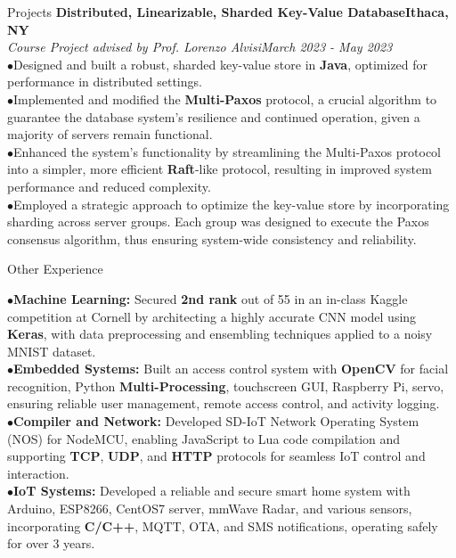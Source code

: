 \documentclass{resume} %
\begin{document}
\begin{rSection}{Projects}
{\bf Distributed, Linearizable, Sharded Key-Value Database}\hfill{\textbf{Ithaca, NY}}
\\{\em Course Project advised by Prof. Lorenzo Alvisi}\hfill {\em March 2023 - May 2023}
\\ $ \bullet $Designed and built a robust, sharded key-value store in \textbf{Java}, optimized for performance in distributed settings.
\\ $ \bullet $Implemented and modified the \textbf{Multi-Paxos} protocol, a crucial algorithm to guarantee the database system's resilience and continued operation, given a majority of servers remain functional.
\\ $ \bullet $Enhanced the system's functionality by streamlining the Multi-Paxos protocol into a simpler, more efficient \textbf{Raft}-like protocol, resulting in improved system performance and reduced complexity.
\\ $ \bullet $Employed a strategic approach to optimize the key-value store by incorporating sharding across server groups. Each group was designed to execute the Paxos consensus algorithm, thus ensuring system-wide consistency and reliability.

\end{rSection}

\begin{rSection}{Other Experience}

$ \bullet $\textbf{Machine Learning:} Secured \textbf{2nd rank} out of 55 in an in-class Kaggle competition at Cornell by architecting a highly accurate CNN model using \textbf{Keras}, with data preprocessing and ensembling techniques applied to a noisy MNIST dataset.
\\ $ \bullet $\textbf{Embedded Systems:} Built an access control system with \textbf{OpenCV} for facial recognition, Python \textbf{Multi-Processing}, touchscreen GUI, Raspberry Pi, servo, ensuring reliable user management, remote access control, and activity logging.
\\ $ \bullet $\textbf{Compiler and Network:} Developed SD-IoT Network Operating System (NOS) for NodeMCU, enabling JavaScript to Lua code compilation and supporting \textbf{TCP}, \textbf{UDP}, and \textbf{HTTP} protocols for seamless IoT control and interaction.
\\ $ \bullet $\textbf{IoT Systems:} Developed a reliable and secure smart home system with Arduino, ESP8266, CentOS7 server, mmWave Radar, and various sensors, incorporating \textbf{C/C++}, MQTT, OTA, and SMS notifications, operating safely for over 3 years.


\end{rSection}

\newpage
\end{document}
